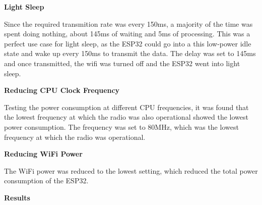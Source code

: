 \documentclass{article}
\begin{document}
 
\textbf{Light Sleep}

Since the required transmition rate was every 150ms, a majority of the time was spent doing nothing, about 145ms of waiting and 5ms of processing. This was a perfect use case for light sleep, as the ESP32 could go into a this low-power idle state and wake up every 150ms to transmit the data. The delay was set to 145ms and once transmitted, the wifi was turned off and the ESP32 went into light sleep.


\textbf{Reducing CPU Clock Frequency}

Testing the power consumption at different CPU frequencies, it was found that the lowest frequency at which the radio was also operational showed the lowest power consumption. The frequency was set to 80MHz, which was the lowest frequency at which the radio was operational.

\textbf{Reducing WiFi Power}

The WiFi power was reduced to the lowest setting, which reduced the total power consumption of the ESP32.

\newpage
\textbf{Results}
\end{document}
